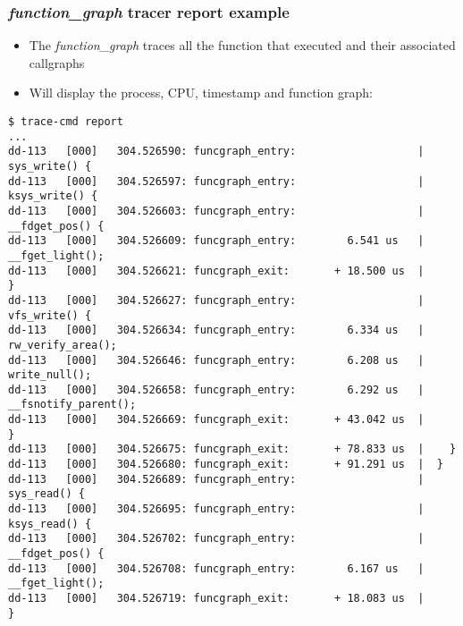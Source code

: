 \begin{frame}[fragile]
  \frametitle{{\em function\_graph} tracer report example}
  \begin{itemize}
    \item The {\em function\_graph} traces all the function that
      executed and their associated callgraphs
    \item Will display the process, CPU, timestamp and function graph:
  \end{itemize}
  \begin{block}{}
    \begin{verbatim}
$ trace-cmd report
...
dd-113   [000]   304.526590: funcgraph_entry:                   |  sys_write() {
dd-113   [000]   304.526597: funcgraph_entry:                   |    ksys_write() {
dd-113   [000]   304.526603: funcgraph_entry:                   |      __fdget_pos() {
dd-113   [000]   304.526609: funcgraph_entry:        6.541 us   |        __fget_light();
dd-113   [000]   304.526621: funcgraph_exit:       + 18.500 us  |      }
dd-113   [000]   304.526627: funcgraph_entry:                   |      vfs_write() {
dd-113   [000]   304.526634: funcgraph_entry:        6.334 us   |        rw_verify_area();
dd-113   [000]   304.526646: funcgraph_entry:        6.208 us   |        write_null();
dd-113   [000]   304.526658: funcgraph_entry:        6.292 us   |        __fsnotify_parent();
dd-113   [000]   304.526669: funcgraph_exit:       + 43.042 us  |      }
dd-113   [000]   304.526675: funcgraph_exit:       + 78.833 us  |    }
dd-113   [000]   304.526680: funcgraph_exit:       + 91.291 us  |  }
dd-113   [000]   304.526689: funcgraph_entry:                   |  sys_read() {
dd-113   [000]   304.526695: funcgraph_entry:                   |    ksys_read() {
dd-113   [000]   304.526702: funcgraph_entry:                   |      __fdget_pos() {
dd-113   [000]   304.526708: funcgraph_entry:        6.167 us   |        __fget_light();
dd-113   [000]   304.526719: funcgraph_exit:       + 18.083 us  |      }
    \end{verbatim}
  \end{block}
\end{frame}

